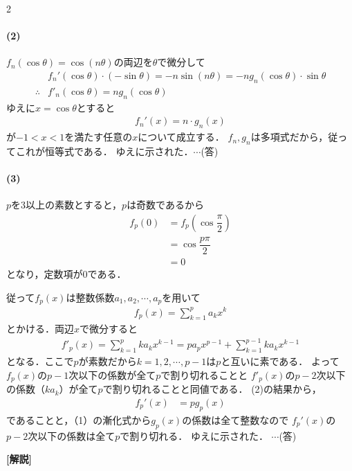 \documentclass[../../main.tex]{subfiles}
\begin{document}
\begin{multicols}{2}
  \paragraph{(2)}
  $f_n(\cos\theta)=\cos(n\theta)$の両辺を$\theta$で微分して
  \begin{align}
    & f_n'(\cos\theta)\cdot (-\sin\theta) = -n\sin(n\theta) = -n g_n(\cos\theta)\cdot \sin\theta \\
    \therefore
    & f'_{n}(\cos\theta) = n g_n(\cos\theta)
  \end{align}
  ゆえに$x=\cos\theta$とすると
  \begin{align}
    f_n'(x) = n\cdot g_n(x)
  \end{align}
  が$-1<x<1$を満たす任意の$x$について成立する．
  $f_n,g_n$は多項式だから，従ってこれが恒等式である．
  ゆえに示された．$\cdots$(答)

  \paragraph{(3)}
  $p$を$3$以上の素数とすると，$p$は奇数であるから
  \begin{align}
    f_p(0)
    & =f_p\left(\cos\dfrac{\pi}{2}\right) \\
    & =\cos\dfrac{p\pi}{2}                \\
    & =0
  \end{align}
  となり，定数項が$0$である．

  従って$f_p(x)$は整数係数$a_1,a_2,\cdots,a_p$を用いて
  \begin{align}
    f_p(x) = \sum_{k=1}^{p} a_k x^{k}
  \end{align}
  とかける．両辺$x$で微分すると
  \begin{align}
    f'_p(x) = \sum_{k=1}^{p} k a_k x^{k-1} = pa_px^{p-1} + \sum_{k=1}^{p-1} k a_k x^{k-1}
  \end{align}
  となる．ここで$p$が素数だから$k=1,2,\cdots,p-1$は$p$と互いに素である．
  よって$f_p(x)$の$p-1$次以下の係数が全て$p$で割り切れることと
  $f'_p(x)$の$p-2$次以下の係数（$ka_k$）が全て$p$で割り切れることと同値である．
  (2)の結果から，
  \begin{align} \label{eq:3}
    f_p'(x) & = pg_p(x)
  \end{align}
  であることと，（1）の漸化式から$g_p(x)$の係数は全て整数なので
  $f_p'(x)$の$p-2$次以下の係数は全て$p$で割り切れる．
  ゆえに示された．
  $\cdots$(答)

  {\bf [解説]}

  \newpage
\end{multicols}
\end{document}
